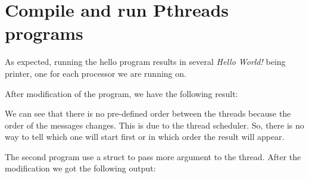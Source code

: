 \chapter{Compile and run Pthreads programs}

As expected, running the hello program results in several \textit{Hello World!} being printer, one for each processor we are running on.

After modification of the program, we have the following result:



We can see that there is no pre-defined order between the threads because the order of the messages changes. This is due to the thread scheduler. So, there is no way to tell which one will start first or in which order the result will appear.

The second program use a struct to pass more argument to the thread. After the modification we got the following output:



